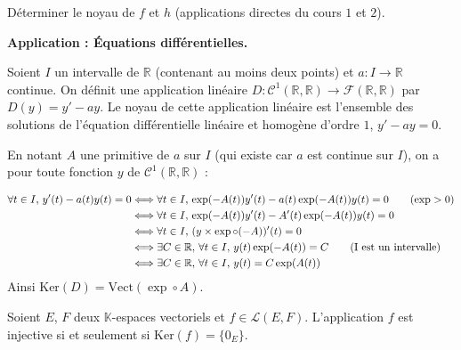 \documentclass[a4paper,10pt]{report}
\begin{document}
\begin{ApplicationDirecte} Déterminer le noyau de $f$ et $h$ (applications directes du cours $1$ et $2$).
\end{ApplicationDirecte}

\textbf{Application : Équations différentielles.}

Soient $I$ un intervalle de $\mathbb{R}$ (contenant au moins deux points) et $a : I \rightarrow \mathbb{R}$ continue. On définit une application linéaire $D : \mathcal{C}^1(\mathbb{R}, \mathbb{R}) \rightarrow \mathcal{F}(\mathbb{R}, \mathbb{R})$ par $D(y)=y'-ay$. Le noyau de cette application linéaire est l'ensemble des solutions de l'équation différentielle linéaire et homogène d'ordre $1$, $y'-ay=0$.

\medskip 

En notant $A$ une primitive de $a$ sur $I$ (qui existe car $a$ est continue sur $I$), on a pour toute fonction $y$ de $\mathcal{C}^1(\mathbb{R}, \mathbb{R})$ : 

\begin{align*}
\forall t \in I, \, y'(t)-a(t)y(t) =0& \Longleftrightarrow  \forall t \in I, \, \exp(-A(t))y'(t)- a(t)\exp(-A(t))y(t) = 0  \qquad (\exp >0)\\
 & \Longleftrightarrow  \forall t \in I, \, \exp(-A(t))y'(t)- A'(t)\exp(-A(t))y(t) = 0 \\
 & \Longleftrightarrow  \forall t \in I, \, (y \times \exp \circ (-A))'(t) = 0 \\
 & \Longleftrightarrow  \exists C \in \mathbb{R}, \,  \forall t \in I, \, y(t)  \exp (-A(t)) = C \qquad \hbox{(I est un intervalle)}\\
 & \Longleftrightarrow  \exists C \in \mathbb{R}, \,  \forall t \in I, \, y(t) = C \exp (A(t)) \\
\end{align*}
Ainsi $\textrm{Ker}(D) = \textrm{Vect}(\exp \circ A)$.

\begin{Proposition}{} Soient $E$, $F$ deux $\mathbb{K}$-espaces vectoriels et $f \in \mathcal{L}(E,F)$. L'application $f$ est injective si et seulement si $\textrm{Ker}(f) = \lbrace 0_E \rbrace$.
\end{Proposition}
\end{document}
